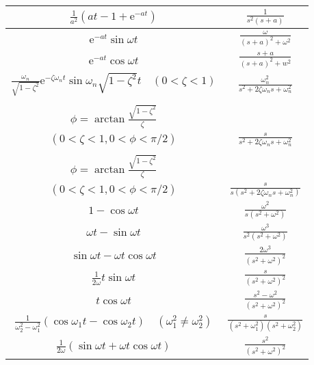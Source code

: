 \begin{centering}
\begin{longtable}{|c|c|}
            $\frac{1}{a^{2}}\left(at-1+\mathrm{e}^{-at}\right)$& $\frac{1}{s^{2}(s+a)}$\\   \hline
            $\mathrm{e}^{-a t} \sin \omega t$   &   $\frac{\omega}{(s+a)^{2}+\omega^{2}}$   \\  \hline
            $\mathrm{e}^{-a t} \cos \omega t$   &   $\frac{s+a}{(s+a)^{2}+w^{2}}$   \\  \hline
            $\frac{\omega_{n}}{\sqrt{1-\zeta^{2}}} \mathrm{e}^{-\zeta \omega_{n} t} \sin \omega_{n} \sqrt{1-\zeta^{2}} t \quad(0<\zeta<1)$  &   $\frac{\omega_{n}^{2}}{s^{2}+2 \zeta \omega_{n} s+\omega_{n}^{2}}$  \\  \hline
            \begin{tabular}{c}$-\frac{1}{\sqrt{1-\zeta^{2}}} \mathrm{e}^{-\zeta \omega_{n} t} \sin \left(\omega_{n} \sqrt{1-\zeta^{2}} t-\phi\right)$\\ $\phi=\arctan \frac{\sqrt{1-\zeta^{2}}}{\zeta}$\\ $(0<\zeta<1,0<\phi<\pi / 2)$\end{tabular}   &   $\frac{s}{s^{2}+2 \zeta \omega_{n} s+\omega_{n}^{2}}$    \\  \hline
            \begin{tabular}{c}$1-\frac{1}{\sqrt{1-\zeta^{2}}} \mathrm{e}^{-\zeta \omega_{n} t} \sin \left(\omega_{n} \sqrt{1-\zeta^{2}} t+\phi\right)$\\ $\phi=\arctan \frac{\sqrt{1-\zeta^{2}}}{\zeta}$\\ $(0<\zeta<1,0<\phi<\pi / 2)$\end{tabular}   &   $\frac{s}{s(s^{2}+2 \zeta \omega_{n} s+\omega_{n}^{2})}$ \\
            $1-\cos\omega t$    & $\frac{\omega^2}{s(s^2+\omega^2)}$    \\   \hline
            $\omega t-\sin\omega t$    & $\frac{\omega^3}{s^2(s^2+\omega^2)}$       \\  \hline
            $\sin\omega t-\omega t \cos\omega t$    &   $\frac{2\omega^3}{(s^2+\omega^2)^2}$    \\  \hline
            $\frac{1}{2\omega}t\sin\omega   t$ & $\frac{s}{(s^2+\omega^2)^2}$   \\  \hline
            $t\cos\omega t$ & $\frac{s^2-\omega^2}{(s^2+\omega^2)^2}$   \\  \hline
            $\frac{1}{\omega_2^2-\omega_1^2}(\cos\omega_1t-\cos\omega_2t)\quad(\omega_1^2\neq\omega_2^2)$  & $\frac{s}{(s^2+\omega_1^2)(s^2+\omega_2^2)}$  \\   \hline
            $\frac{1}{2\omega}(\sin\omega t+\omega t \cos \omega t)$  & $\frac{s^2}{(s^2+\omega^2)^2}$  \\
        \hline
    \end{longtable}
\end{centering}

